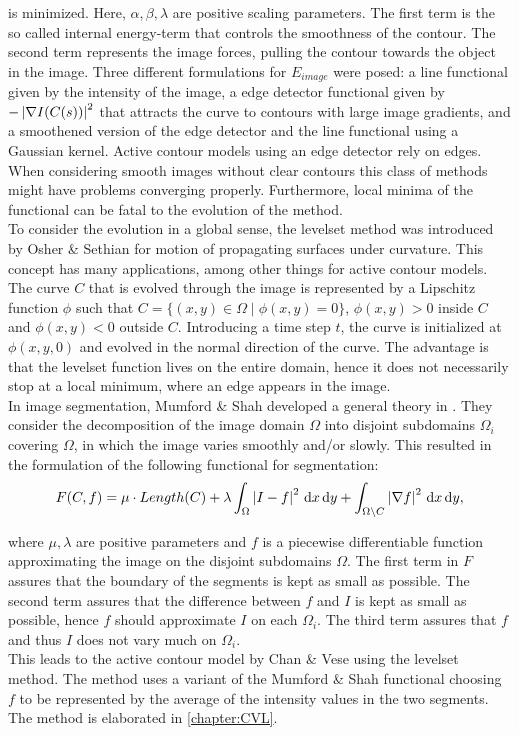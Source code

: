 is minimized. Here, $\alpha, \beta, \lambda$ are positive scaling parameters. The first term is the so called internal energy-term that controls the smoothness of the contour. The second term represents the image forces, pulling the contour towards the object in the image. Three different formulations for $E_{image}$ were posed: a line functional given by the intensity of the image, a edge detector functional given by $-\left| {\nabla I(C(s))} \right|^2$ that attracts the curve to contours with large image gradients, and a smoothened version of the edge detector and the line functional using a Gaussian kernel. Active contour models using an edge detector rely on edges. When considering smooth images without clear contours this class of methods might have problems converging properly. Furthermore, local minima of the functional can be fatal to the evolution of the method.\\

To consider the evolution in a global sense, the levelset method was introduced by Osher \& Sethian \cite{osher.88} for motion of propagating surfaces under curvature. This concept has many applications, among other things for active contour models. The curve $C$ that is evolved through the image is represented by a Lipschitz function $\phi$ such that $C=\{(x,y)\in\Omega\;|\; \phi(x,y) = 0\}$, $\phi(x,y)> 0$ inside $C$ and $\phi(x,y)<0$ outside $C$. Introducing a time step $t$, the curve is initialized at $\phi(x,y,0)$ and evolved in the normal direction of the curve. The advantage is that the levelset function lives on the entire domain, hence it does not necessarily stop at a local minimum, where an edge appears in the image.\\

In image segmentation, Mumford \& Shah developed a general theory in \cite{mumford.89}. They consider the decomposition of the image domain $\Omega$ into disjoint subdomains $\Omega_i$ covering $\Omega$, in which the image varies smoothly and/or slowly. This resulted in the formulation of the following functional for segmentation:
\begin{equation}
  F(C,f) = \mu\cdot Length(C) + \lambda \int_\Omega \left| {I-f} \right|^2 \,{\rm d} x\,{\rm d} y + \int_{\Omega\backslash C} \left| {\nabla f} \right|^2 \,{\rm d} x\,{\rm d} y,
\end{equation}

where $\mu,\lambda$ are positive parameters and $f$ is a piecewise differentiable function approximating the image on the disjoint subdomains $\Omega$. The first term in $F$ assures that the boundary of the segments is kept as small as possible. The second term assures that the difference between $f$ and $I$ is kept as small as possible, hence $f$ should approximate $I$ on each $\Omega_i$. The third term assures that $f$ and thus $I$ does not vary much on $\Omega_i$.\\
This leads to the active contour model by Chan \& Vese \cite{chan.01} using the levelset method. The method uses a variant of the Mumford \& Shah functional choosing $f$ to be represented by the average of the intensity values in the two segments. The method is elaborated in \cref{chapter:CVL}.\\

